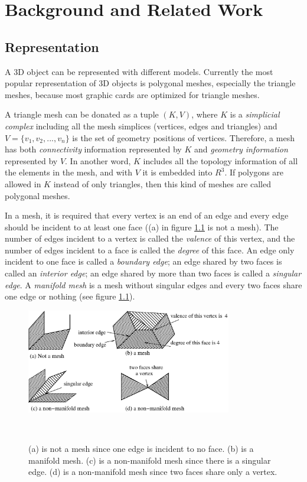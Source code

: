 \documentclass[11pt, a4paper]{report}
\begin{document}
\chapter{Background and Related Work}
\label{c:related}
    \section{Representation}
    \label{s:related:representation}
    A 3D object can be represented with different models.
    Currently the most popular representation of 3D objects is polygonal meshes, 
    especially the triangle meshes, because most graphic cards are optimized for triangle meshes. 

    A triangle mesh can be donated as a tuple $(K, V)$, where $K$ is a
    \emph{simplicial complex} including all the mesh simplices 
    (vertices, edges and triangles) and $V =\{v_{1}, v_{2}, ...,
    v_{n}\}$ is the set of geometry positions of vertices. Therefore,
    a mesh has both \emph{connectivity} information represented by $K$
    and \emph{geometry information} represented by $V$. In another
    word, $K$ includes all the topology information of all the
    elements in the mesh, and with $V$ it is embedded into $R^{3}$. If
    polygons are allowed in $K$ instead of only triangles, then this
    kind of meshes are called polygonal meshes.

    In a mesh, it is required that every
    vertex is an end of an edge and every edge should be incident to at
    least one face ((a) in figure \ref{mesh_non_mesh} is not a mesh).
    The number of edges incident to a vertex is called the
    \emph{valence} of this vertex, and the number of edges incident to
    a face is called the \emph{degree} of this face. An edge only
    incident to one face is called a \emph{boundary edge}; an edge
    shared by two faces is called an \emph{interior edge}; an edge
    shared by more than two faces is called a \emph{singular edge}. A
    \emph{manifold mesh} is a mesh without singular edges and every
    two faces share one edge or nothing (see figure \ref{mesh_non_mesh}).
\begin{figure}
\centering
\includegraphics[width=0.8\textwidth]{figure2.1.eps}
\caption[Manifold mesh, non-manifold mesh and non-mesh]{ (a) is not
a mesh since one edge is incident to no face. (b) is a manifold
mesh. (c) is a non-manifold mesh since there is a singular edge.
(d) is a non-manifold mesh since two faces share only a
vertex.\label{mesh_non_mesh}}\
\end{figure}
\end{document}
